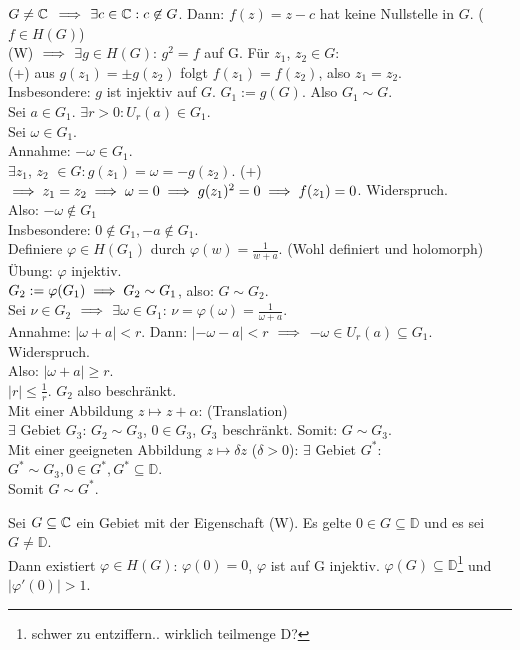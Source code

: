 \documentclass[a4paper,twoside,DIV15,BCOR12mm]{scrbook}
\def\MdD{\mathbb{D}}
\begin{document}
\begin{beweis}
  $G \ne \mathbb{C}$ $\implies$ $\exists c\in \mathbb{C}: c\not\in G$. Dann: $f(z)=z-c$ hat keine Nullstelle in $G$. ($f\in H(G)$)\\
  (W) $\implies$ $\exists g\in H(G)$: $g^2 = f$ auf G. F\"ur $z_1$, $z_2 \in G$:\\
  (+) aus $g(z_1)=\pm g(z_2)$ folgt $f(z_1)=f(z_2)$, also $z_1 = z_2$.\\
  Insbesondere: $g$ ist injektiv auf $G$. $G_1:=g(G)$. Also $G_1 \sim G$.\\
  Sei $a \in G_1$. $\exists r>0: U_r(a) \in G_1$. \\
  
  Sei $\omega \in G_1$.\\
  Annahme: $-\omega \in G_1$. \\
  $\exists z_1$, $z_2$ $\in G: g(z_1)=\omega=-g(z_2)$. (+) $\implies z_1=z_2\implies \omega=0\implies g(z_1)^2=0\implies f(z_1)=0$. Widerspruch.\\
  Also: $-\omega \not\in G_1$\\

  Insbesondere: $0\not\in G_1, -a\not\in G_1$.\\
  Definiere $\varphi \in H(G_1)$ durch $\varphi(w)=\frac1{w+a}$. (Wohl definiert und holomorph)\\
  \"Ubung: $\varphi$ injektiv.\\
  $G_2:=\varphi(G_1) \implies G_2 \sim G_1$, also: $G\sim G_2$.\\
  Sei $\nu \in G_2$ $\implies$ $\exists \omega \in G_1$: $\nu=\varphi(\omega)=\frac1{\omega+a}$.\\

  Annahme: $|\omega+a|<r$. Dann: $|-\omega-a|<r$ $\implies$ $-\omega \in U_r(a) \subseteq G_1$. Widerspruch.\\
  Also: $|\omega+a| \ge r$.\\
  
  \folgt $|r| \le \frac1r$. $G_2$ also beschr\"ankt.\\
  Mit einer Abbildung $z\mapsto z+\alpha$: (Translation)\\ 
  $\exists$ Gebiet $ G_3$: $G_2 \sim G_3$, $0\in G_3$, $G_3$ beschr\"ankt. Somit: $G \sim G_3$.\\
  Mit einer geeigneten Abbildung $z\mapsto \delta z$ ($\delta>0$): $\exists$ Gebiet $G^*$: $G^* \sim G_3, 0\in G^*, G^* \subseteq \mathbb{D}$. \\
  Somit $G\sim G^*$.
\end{beweis}
\begin{lemma}
  Sei $G\subseteq \mathbb{C}$ ein Gebiet mit der Eigenschaft (W). Es gelte $0\in G\subseteq\MdD$ und es sei $G\ne\MdD$. \\
  Dann existiert $\varphi \in H(G)$: $\varphi(0)=0$, $\varphi$ ist auf G injektiv. $\varphi(G)\subseteq\MdD$\footnote{schwer zu entziffern.. wirklich teilmenge D?} und $|\varphi'(0)|>1$.
\end{lemma}
\end{document}
